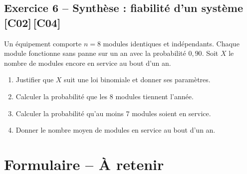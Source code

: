 \documentclass[a4paper,11pt]{article}
\begin{document}
\subsection*{Exercice 6 -- Synthèse : fiabilité d'un système \hfill {\normalsize\color{uimmred}[C02]\,[C04]}}
Un équipement comporte $n = 8$ modules identiques et indépendants. Chaque module fonctionne sans panne sur un an avec la probabilité $0{,}90$. Soit $X$ le nombre de modules encore en service au bout d'un an.
\begin{enumerate}[label=\alph*)]
  \item Justifier que $X$ suit une loi binomiale et donner ses paramètres.
  \item Calculer la probabilité que les $8$ modules tiennent l'année.
  \item Calculer la probabilité qu'au moins $7$ modules soient en service.
  \item Donner le nombre moyen de modules en service au bout d'un an.
\end{enumerate}

\newpage
\section*{Formulaire -- À retenir}
\end{document}

